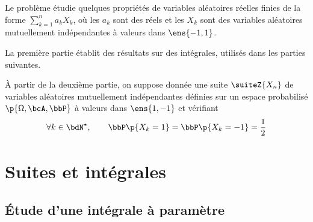 \documentclass[a4paper,french,bookmarks]{article}
\begin{document}
    \renewcommand{\thesection}{\Roman{section}}
    \renewcommand{\thesubsection}{\Roman{section}.\Alph{subsection}}
    \renewcommand{\labelenumi}{\thesubsection.\arabic{enumi})}
    \renewcommand*{\labelenumii}{\alph{enumii})}

    
    Le problème étudie quelques propriétés de variables aléatoires réelles finies de la forme $\sum_{k=1}^n a_kX_k$, où les $a_k$ sont des réels et les $X_k$ sont des variables aléatoires mutuellement indépendantes à valeurs dans $\ens{-1, 1}$.
    
    \begin{enumerate}
        \itt La première partie établit des résultats sur des intégrales, utilisés dans les parties suivantes.
        
        \itt À partir de la deuxième partie, on suppose donnée une suite $\suiteZ{X_n}$ de variables aléatoires mutuellement indépendantes définies sur un espace probabilisé $\p{\Omega, \bcA, \bbP}$ à valeurs dans $\ens{1, -1}$ et vérifiant
        \[ \forall k \in \bdN^\star,\qquad \bbP\p{X_k = 1} = \bbP\p{X_k = -1} = \dfrac{1}{2}\]
    \end{enumerate}
    
    \section{Suites et intégrales}
    
    \subsection{Étude d'une intégrale à paramètre}
    
\end{document}
